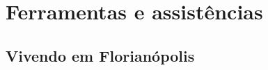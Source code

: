 \section{Ferramentas e assistências}




    \subsection{Vivendo em Florianópolis}
    
%    
    

% 
% 
% 

